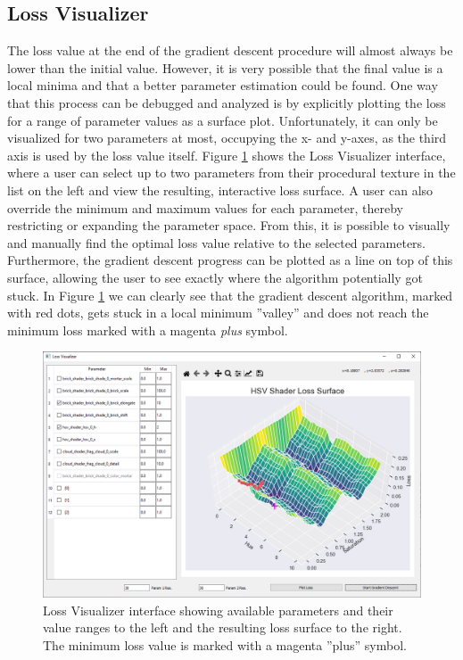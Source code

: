 \subsection{Loss Visualizer}\label{sec:LossVisualizerInterface}

The loss value at the end of the gradient descent procedure will almost always be lower than the initial value. However, it is very possible that the final value is a local minima and that a better parameter estimation could be found. One way that this process can be debugged and analyzed is by explicitly plotting the loss for a range of parameter values as a surface plot. Unfortunately, it can only be visualized for two parameters at most, occupying the x- and y-axes, as the third axis is used by the loss value itself. Figure \ref{fig:LossVisualizer} shows the Loss Visualizer interface, where a user can select up to two parameters from their procedural texture in the list on the left and view the resulting, interactive loss surface. A user can also override the minimum and maximum values for each parameter, thereby restricting or expanding the parameter space. From this, it is possible to visually and manually find the optimal loss value relative to the selected parameters. Furthermore, the gradient descent progress can be plotted as a line on top of this surface, allowing the user to see exactly where the algorithm potentially got stuck. In Figure \ref{fig:LossVisualizer} we can clearly see that the gradient descent algorithm, marked with red dots, gets stuck in a local minimum ''valley'' and does not reach the minimum loss marked with a magenta \textit{plus} symbol.

\begin{figure}[!h]
    \centering
    \includegraphics[width=.9\textwidth]{img/method/Loss Visualizer v3.PNG}
    \caption{Loss Visualizer interface showing available parameters and their value ranges to the left and the resulting loss surface to the right. The minimum loss value is marked with a magenta ''plus'' symbol.}
    \label{fig:LossVisualizer}
\end{figure}